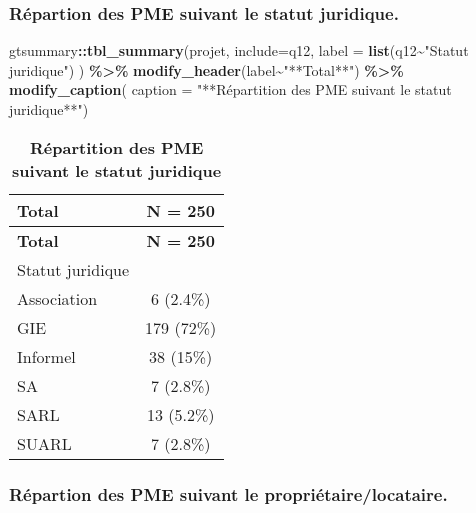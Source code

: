 \documentclass[
]{article}
\newenvironment{Shaded}{\begin{snugshade}}{\end{snugshade}}
\newcommand{\AttributeTok}[1]{\textcolor[rgb]{0.13,0.29,0.53}{#1}}
\newcommand{\FunctionTok}[1]{\textcolor[rgb]{0.13,0.29,0.53}{\textbf{#1}}}
\newcommand{\NormalTok}[1]{#1}
\newcommand{\SpecialCharTok}[1]{\textcolor[rgb]{0.81,0.36,0.00}{\textbf{#1}}}
\newcommand{\StringTok}[1]{\textcolor[rgb]{0.31,0.60,0.02}{#1}}
\begin{document}
\hypertarget{ruxe9partion-des-pme-suivant-le-statut-juridique.}{%
\subsubsection{Répartion des PME suivant le statut
juridique.}\label{ruxe9partion-des-pme-suivant-le-statut-juridique.}}

\begin{Shaded}
\begin{Highlighting}[]
\NormalTok{gtsummary}\SpecialCharTok{::}\FunctionTok{tbl\_summary}\NormalTok{(projet, }\AttributeTok{include=}\NormalTok{q12, }\AttributeTok{label =} \FunctionTok{list}\NormalTok{(q12}\SpecialCharTok{\textasciitilde{}}\StringTok{"Statut juridique"}\NormalTok{)}
\NormalTok{            ) }\SpecialCharTok{\%\textgreater{}\%} \FunctionTok{modify\_header}\NormalTok{(label}\SpecialCharTok{\textasciitilde{}}\StringTok{"**Total**"}\NormalTok{) }\SpecialCharTok{\%\textgreater{}\%} \FunctionTok{modify\_caption}\NormalTok{(}
              \AttributeTok{caption =} \StringTok{"**Répartition des PME suivant}
\StringTok{              le statut juridique**"}\NormalTok{)}
\end{Highlighting}
\end{Shaded}

\begin{longtable}[]{@{}lc@{}}
\caption{\textbf{Répartition des PME suivant le statut
juridique}}\tabularnewline
\toprule\noalign{}
\textbf{Total} & \textbf{N = 250} \\
\midrule\noalign{}
\endfirsthead
\toprule\noalign{}
\textbf{Total} & \textbf{N = 250} \\
\midrule\noalign{}
\endhead
\bottomrule\noalign{}
\endlastfoot
Statut juridique & \\
Association & 6 (2.4\%) \\
GIE & 179 (72\%) \\
Informel & 38 (15\%) \\
SA & 7 (2.8\%) \\
SARL & 13 (5.2\%) \\
SUARL & 7 (2.8\%) \\
\end{longtable}

\hypertarget{ruxe9partion-des-pme-suivant-le-propriuxe9tairelocataire.}{%
\subsubsection{Répartion des PME suivant le
propriétaire/locataire.}\label{ruxe9partion-des-pme-suivant-le-propriuxe9tairelocataire.}}
\end{document}
